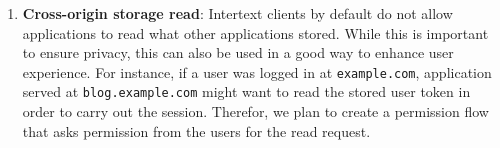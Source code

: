 \begin{enumerate}
    \item \textbf{Cross-origin storage read}: Intertext clients by default do not allow applications to read what other applications stored. While this is important to ensure privacy, this can also be used in a good way to enhance user experience. For instance, if a user was logged in at \texttt{example.com}, application served at \texttt{blog.example.com} might want to read the stored user token in order to carry out the session. Therefor, we plan to create a permission flow that asks permission from the users for the read request.
    
\end{enumerate}
